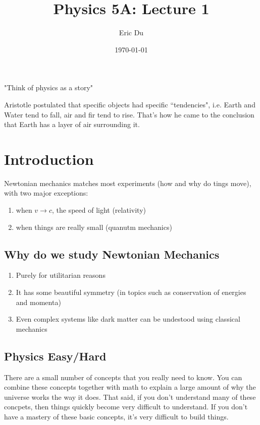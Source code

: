 \documentclass{article}
\title{Physics 5A: Lecture 1}
\author{Eric Du}
\date{\today}
\theoremstyle{definition}
\numberwithin{equation}{section}
\numberwithin{definition}{section}
\begin{document}
	\maketitle
	\tableofcontents
	
	"Think of physics as a story"
	\medskip
	
	Aristotle postulated that specific objects had specific ``tendencies", i.e. Earth and Water tend to fall, air and fir tend to rise. That's how he came to the conclusion that Earth has a layer of air surrounding it. 
	
	\section{Introduction}
	
	Newtonian mechanics matches most experiments (how and why do tings move), with two major exceptions:
	
	\begin{enumerate}
		\item when $v \to c$, the speed of light (relativity)
		\item when things are really small (quanutm mechanics)
	\end{enumerate}

	\subsection{Why do we study Newtonian Mechanics}
	
	\begin{enumerate}
		\item Purely for utilitarian reasons 
		\item It has some beautiful symmetry (in topics such as conservation of energies and momenta)
		\item Even complex systems like dark matter can be undestood using classical mechanics
		\end{enumerate}
	
	\subsection{Physics Easy/Hard}
	
	There are a small number of concepts that you really need to know. You can combine these concepts together with math to explain a large amount of why the universe works the way it does. That said, if you don't understand many of these concpets, then things quickly become very difficult to understand. If you don't have a mastery of these basic concepts, it's very difficult to build things.
	
\end{document}
